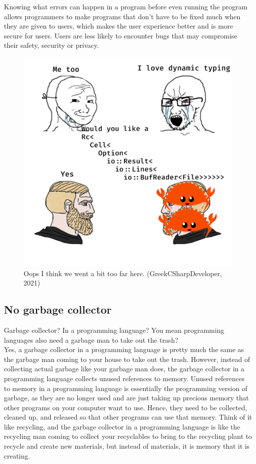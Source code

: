 \documentclass[11pt]{article}
\makeatletter
\newcommand{\citeprocitem}[2]{\hyper@linkstart{cite}{citeproc_bib_item_#1}#2\hyper@linkend}
\makeatother
\begin{document}
Knowing what errors can happen in a program before even running
the program allows programmers to make programs that don't have
to be fixed much when they are given to users, which makes the
user experience better and is more secure for users.
Users are less likely to encounter bugs that may compromise
their safety, security or privacy.

\begin{figure}[htbp]
\centering
\includegraphics[width=.9\linewidth]{./images/return-types-in-rust.png}
\caption{Oops I think we went a bit too far here. (\citeprocitem{16}{GreekCSharpDeveloper, 2021})}
\end{figure}

 \newpage

\subsection{No garbage collector}
\label{sec:org292dcc3}
Garbage collector? In a programming language?
You mean programming languages also need a garbage man
to take out the trash?  \\

Yes, a garbage collector in a programming language
is pretty much the same as the garbage man coming
to your house to take out the trash. However,
instead of collecting actual garbage like your
garbage man does, the garbage collector in
a programming language collects
unused references to memory. Unused references to memory
in a programming language is essentially the programming
version of garbage, as they are no longer used and
are just taking up precious memory that other programs
on your computer want to use. Hence, they need to be collected,
cleaned up, and released so that other programs can use that
memory. Think of it like recycling, and the garbage collector
in a programming language is like the recycling man coming to
collect your recyclables to bring to the recycling plant to
recycle and create new materials, but instead of materials,
it is memory that it is creating.
\end{document}
